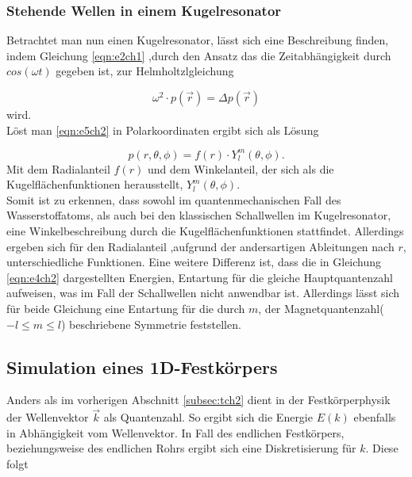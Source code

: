 \subsubsection{Stehende Wellen in einem Kugelresonator}
\label{subsubsec:tch22}
Betrachtet man nun einen Kugelresonator, lässt sich eine Beschreibung finden, indem Gleichung
\eqref{eqn:e2ch1} ,durch den Ansatz das die Zeitabhängigkeit durch $cos(\omega t )$ gegeben ist, zur
Helmholtzlgleichung

\begin{equation}
  \label{eqn:e5ch2}
  \omega^2 \cdot p(\vec r) = \Delta  p(\vec r)
\end{equation}
wird.\\
Löst man \eqref{eqn:e5ch2} in Polarkoordinaten ergibt sich als Lösung

\begin{equation}
  \label{eqn:e6ch2}
  p(r, \theta, \phi) = f(r) \cdot Y_{l}^{m}(\theta, \phi).
\end{equation}
Mit dem Radialanteil $f(r)$ und dem Winkelanteil, der sich als die Kugelflächenfunktionen
herausstellt, $Y_{l}^{m}(\theta, \phi)$.\\

Somit ist zu erkennen, dass sowohl im quantenmechanischen Fall des Wasserstoffatoms, als auch bei
den klassischen Schallwellen im Kugelresonator, eine Winkelbeschreibung durch die Kugelflächenfunktionen stattfindet.
Allerdings ergeben sich für den Radialanteil ,aufgrund der andersartigen Ableitungen nach $r$, unterschiedliche
Funktionen. Eine weitere Differenz ist, dass die in Gleichung \eqref{eqn:e4ch2} dargestellten Energien,
Entartung für die gleiche Hauptquantenzahl aufweisen, was im Fall der Schallwellen nicht anwendbar ist.
Allerdings lässt sich für beide Gleichung eine Entartung für die durch $m$, der Magnetquantenzahl($-l \leq m \leq l$)
beschriebene Symmetrie feststellen.


\subsection{Simulation eines 1D-Festkörpers}
\label{subsec:tch4}
Anders als im vorherigen Abschnitt \ref{subsec:tch2} dient in der Festkörperphysik der Wellenvektor
$\vec k$ als Quantenzahl. So ergibt sich die Energie $E(k)$ ebenfalls in Abhängigkeit vom Wellenvektor.
In Fall des endlichen Festkörpers, beziehungsweise des endlichen Rohrs ergibt sich eine Diskretisierung
für $k$. Diese folgt

